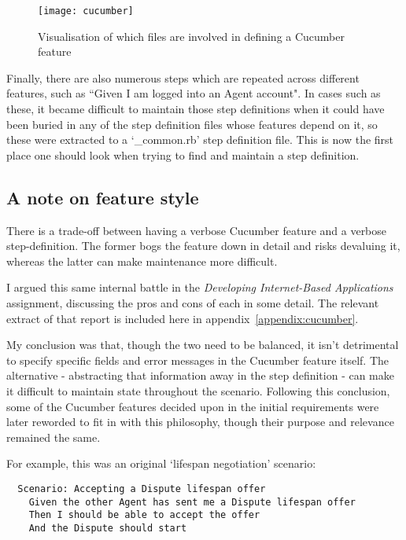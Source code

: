 \begin{figure}[h!]
  \centering
    \ifimages
    \texttt{[image: cucumber]}
    \fi
  \caption{Visualisation of which files are involved in defining a Cucumber feature}
  \label{uml:cucumber}
\end{figure}

Finally, there are also numerous steps which are repeated across different features, such as ``Given I am logged into an Agent account". In cases such as these, it became difficult to maintain those step definitions when it could have been buried in any of the step definition files whose features depend on it, so these were extracted to a `\_common.rb' step definition file. This is now the first place one should look when trying to find and maintain a step definition.

\subsection{A note on feature style}

There is a trade-off between having a verbose Cucumber feature and a verbose step-definition. The former bogs the feature down in detail and risks devaluing it, whereas the latter can make maintenance more difficult.

I argued this same internal battle in the \emph{Developing Internet-Based Applications} assignment, discussing the pros and cons of each in some detail. The relevant extract of that report is included here in appendix~\ref{appendix:cucumber}.

My conclusion was that, though the two need to be balanced, it isn't detrimental to specify specific fields and error messages in the Cucumber feature itself. The alternative - abstracting that information away in the step definition - can make it difficult to maintain state throughout the scenario. Following this conclusion, some of the Cucumber features decided upon in the initial requirements were later reworded to fit in with this philosophy, though their purpose and relevance remained the same.

For example, this was an original `lifespan negotiation' scenario:

\begin{lstlisting}
  Scenario: Accepting a Dispute lifespan offer
    Given the other Agent has sent me a Dispute lifespan offer
    Then I should be able to accept the offer
    And the Dispute should start
\end{lstlisting}


